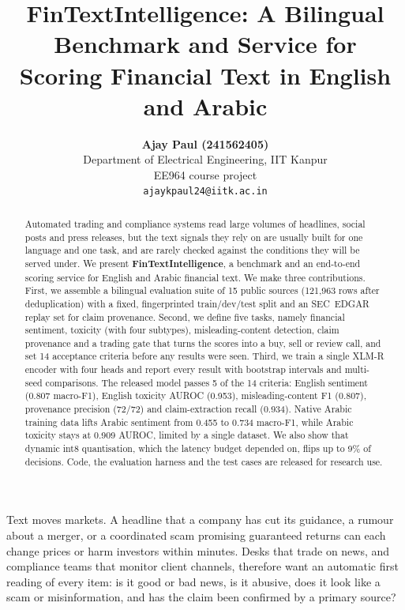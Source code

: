 \documentclass[11pt,a4paper,twocolumn]{article}
\title{\Large\bfseries FinTextIntelligence: A Bilingual Benchmark and Service for\\
Scoring Financial Text in English and Arabic}
\author{
  \textbf{Ajay Paul (241562405)}\\
  Department of Electrical Engineering, IIT Kanpur\\
  EE964 course project\\
  \texttt{ajaykpaul24@iitk.ac.in}
}
\date{}
\makeatletter
\renewcommand\section{\@startsection{section}{1}{\z@}{-2.0ex plus -0.5ex minus -.2ex}{1.5ex plus 0.3ex minus .2ex}{\large\bfseries}}
\makeatother
\begin{document}
\maketitle

\begin{abstract}
Automated trading and compliance systems read large volumes of headlines, social
posts and press releases, but the text signals they rely on are usually built for one
language and one task, and are rarely checked against the conditions they will be served
under. We present \textbf{FinTextIntelligence}, a benchmark and an end-to-end scoring
service for English and Arabic financial text. We make three contributions. First, we
assemble a bilingual evaluation suite of 15 public sources (121,963 rows after
deduplication) with a fixed, fingerprinted train/dev/test split and an SEC~EDGAR replay
set for claim provenance. Second, we define five tasks, namely financial sentiment,
toxicity (with four subtypes), misleading-content detection, claim provenance and a
trading gate that turns the scores into a buy, sell or review call, and set 14 acceptance
criteria before any results were seen. Third, we train a single XLM-R encoder with four
heads and report every result with bootstrap intervals and multi-seed comparisons. The
released model passes 5 of the 14 criteria: English sentiment (0.807 macro-F1), English
toxicity AUROC (0.953), misleading-content F1 (0.807), provenance precision (72/72) and
claim-extraction recall (0.934). Native Arabic training data lifts Arabic sentiment from
0.455 to 0.734 macro-F1, while Arabic toxicity stays at 0.909 AUROC, limited by a single
dataset. We also show that dynamic int8 quantisation, which the latency budget depended
on, flips up to 9\% of decisions. Code, the evaluation harness and the test cases are
released for research use.
\end{abstract}

\section{Introduction}

Text moves markets. A headline that a company has cut its guidance, a rumour about a
merger, or a coordinated scam promising guaranteed returns can each change prices or
harm investors within minutes. Desks that trade on news, and compliance teams that
monitor client channels, therefore want an automatic first reading of every item: is it
good or bad news, is it abusive, does it look like a scam or misinformation, and has the
claim been confirmed by a primary source?
\end{document}
